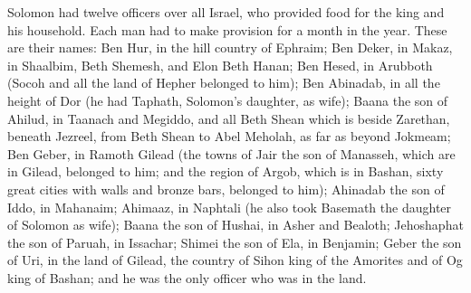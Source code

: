  Solomon had twelve officers over all Israel, who provided
food for the king and his household. Each man had to make provision for
a month in the year.  These are their names: Ben Hur, in the
hill country of Ephraim;  Ben Deker, in Makaz, in Shaalbim,
Beth Shemesh, and Elon Beth Hanan;  Ben Hesed, in Arubboth
(Socoh and all the land of Hepher belonged to him);  Ben
Abinadab, in all the height of Dor (he had Taphath, Solomon's daughter,
as wife);  Baana the son of Ahilud, in Taanach and Megiddo,
and all Beth Shean which is beside Zarethan, beneath Jezreel, from Beth
Shean to Abel Meholah, as far as beyond Jokmeam;  Ben
Geber, in Ramoth Gilead (the towns of Jair the son of Manasseh, which
are in Gilead, belonged to him; and the region of Argob, which is in
Bashan, sixty great cities with walls and bronze bars, belonged to him);
 Ahinadab the son of Iddo, in Mahanaim; 
Ahimaaz, in Naphtali (he also took Basemath the daughter of Solomon as
wife);  Baana the son of Hushai, in Asher and Bealoth;
 Jehoshaphat the son of Paruah, in Issachar; 
Shimei the son of Ela, in Benjamin;  Geber the son of Uri,
in the land of Gilead, the country of Sihon king of the Amorites and of
Og king of Bashan; and he was the only officer who was in the land.

